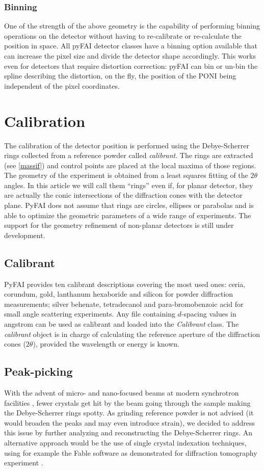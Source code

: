 \documentclass{iucr}
\begin{document}
\subsubsection{Binning}
One of the strength of the above geometry is the capability of performing
binning operations on the detector without having to re-calibrate or
re-calculate the position in space.
All pyFAI detector classes have a binning option available that can increase the
pixel size and divide the detector shape accordingly.
This works even for detectors that require distortion correction: pyFAI can bin
or un-bin the spline describing the distortion, on the fly, the position of the
PONI being independent of the pixel coordinates.

\section{Calibration}

The calibration of the detector position is performed using the Debye-Scherrer
rings collected from a reference powder called \textit{calibrant}.
The rings are extracted (see \ref{massif}) and control points are placed at the
local maxima of those regions.
The geometry of the experiment is obtained from a least squares fitting of
the $2\theta$ angles.
In this article we will call them ``rings'' even if, for planar detector,
they are actually the conic intersections of the diffraction cones
with the detector plane.
PyFAI does not assume that rings are circles, ellipses or parabolas and is able
to optimize the geometric parameters of a wide range of experiments.
The support for the geometry refinement of non-planar detectors is still under
development.

\subsection{Calibrant}
PyFAI provides ten calibrant descriptions covering the most used ones: ceria,
corundum, gold, lanthanum hexaboride and silicon for powder diffraction
measurements; silver behenate, tetradecanol and para-bromobenzoic acid for small
angle scattering experiments.
Any file containing $d$-spacing values in angstrom can be used as calibrant and
loaded into the \textit{Calibrant} class.
The \textit{calibrant} object is in charge of
calculating the reference aperture of the diffraction cones ($2\theta$),
provided the wavelength or energy is known.

\subsection{Peak-picking}
With the advent of micro- and nano-focused beams at modern synchrotron
facilities \cite{id13}, fewer crystals get hit by the beam going through the
sample making the Debye-Scherrer rings spotty.
As grinding reference powder is not advised (it would broaden the peaks
and may even introduce strain), we decided to
address this issue by further analyzing and reconstructing the Debye-Scherrer rings.
An alternative approach would be the use of single crystal indexation techniques, using
for example the Fable software \cite{fable} as demonstrated for diffraction
tomography experiment \cite{bonnin}.
\end{document}
